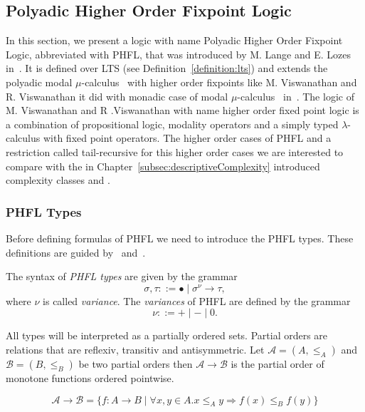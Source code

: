 
\subsection{Polyadic Higher Order Fixpoint Logic}\label{subsec:polyadicHigherOrderFixpointLogic}

In this section, we present a logic with name Polyadic Higher Order Fixpoint Logic, abbreviated with PHFL, that was
introduced by M. Lange and E. Lozes in~\cite{lange2014capturing}. It is defined over LTS (see
Definition~\ref{definition:lts}) and extends the polyadic modal $\mu$-calculus~\cite{otto1999bisimulation} with
higher order fixpoints like M. Viswanathan and R. Viswanathan it did with monadic case of modal
$\mu$-calculus~\cite{kozen1983results} in~\cite{viswanathan2004higher}. The logic of M. Viswanathan and R
.Viswanathan with name higher order fixed point logic is a combination of propositional logic, modality operators and
a simply typed $\lambda$-calculus with fixed point operators. The higher order cases of PHFL and a restriction called
tail-recursive for this higher order cases we are interested to compare with the in
Chapter~\ref{subsec:descriptiveComplexity} introduced complexity classes  and .

\subsubsection{PHFL Types}

Before defining formulas of PHFL we need to introduce the PHFL types. These definitions are guided
by~\cite{viswanathan2004higher} and~\cite{lange2014capturing}.

\begin{definition}
    The syntax of \emph{PHFL types} are given by the grammar
    \[\sigma, \tau ::= \bullet \mid \sigma^\nu \rightarrow \tau,\]
    where $\nu$ is called \textit{variance}. The \emph{variances} of PHFL are defined by the grammar
    \[\nu ::= + \mid - \mid 0.\]
\end{definition}

All types will be interpreted as a partially ordered sets. Partial orders are relations that are reflexiv, transitiv
and antisymmetric. Let $\mathcal{A} = (A, \leq_A)$ and $\mathcal{B} = (B, \leq_B)$ be two partial orders then
$\mathcal{A} \rightarrow \mathcal{B}$ is the partial order of monotone functions ordered pointwise.

\[\mathcal{A} \rightarrow \mathcal{B} = \{f:A\rightarrow B \mid \forall x,y \in A. x\leq_A y\Rightarrow f(x)\leq_B f(y)\}\]

